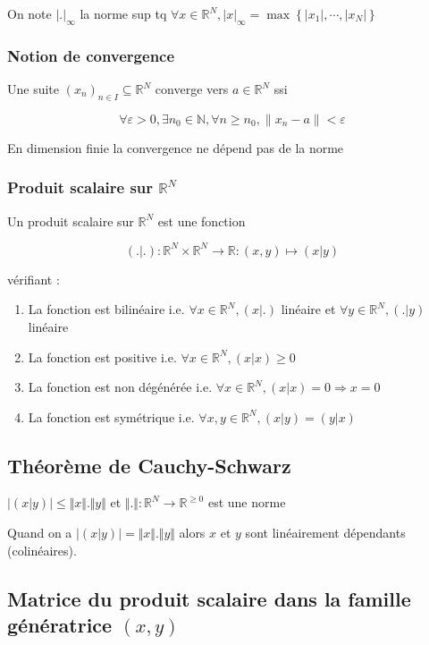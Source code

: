 \documentclass[a4paper,10pt]{article}
\newcommand{\ap}{\rightarrow}
\newcommand{\R}{\mathbb{R}}
\newcommand{\N}{\mathbb{N}}
\newcommand{\so}{\Rightarrow}
\newcommand{\tset}[1]{\left\lbrace #1 \right\rbrace}
\newcommand{\abs}[1]{\left\vert #1 \right\vert}
\begin{document}
On note $\abs{.}_\infty$ la norme sup tq $\forall x \in \R^N, \abs{x}_\infty = \max \tset{\abs{x_1}, \cdots, \abs{x_N}}$

\subsubsection{Notion de convergence}

Une suite $(x_n)_{n\in I} \subseteq \R^N$ converge vers $a \in \R^N$ ssi

$$\forall \varepsilon > 0 , \exists n_0 \in \N, \forall n \geq n_0,\parallel x_n - a \parallel < \varepsilon$$

En dimension finie la convergence ne dépend pas de la norme

\subsubsection{Produit scalaire sur $\R^N$}

Un produit scalaire sur $\R^N$ est une fonction 

$$(. \vert .) : \R^N \times \R^N \ap \R : (x,y) \mapsto (x \vert y)$$

vérifiant :

\begin{enumerate}
	\item{La fonction est bilinéaire i.e. $\forall x \in \R^N, (x \vert .)$ linéaire et $\forall y \in \R^N,(. \vert y)$ linéaire}
	\item{La fonction est positive i.e. $\forall x \in \R^N, (x \vert x) \geq 0$}
	\item{La fonction est non dégénérée i.e. $\forall x \in \R^N, (x \vert x) = 0 \so x = 0$}
	\item{La fonction est symétrique i.e. $\forall x,y \in \R^N, (x \vert y) = (y \vert x)$}
\end{enumerate}

\subsection{Théorème de Cauchy-Schwarz}

$\abs{(x\vert y)} \leq \Vert x \Vert . \Vert y \Vert$ et $\Vert . \Vert : \R^N \ap \R^{\geq 0}$ est une norme

Quand on a $\abs{(x \vert y)} = \Vert x \Vert . \Vert y \Vert$ alors $x$ et $y$ sont linéairement dépendants (colinéaires).

\subsection{Matrice du produit scalaire dans la famille génératrice $(x,y)$}
\end{document}
